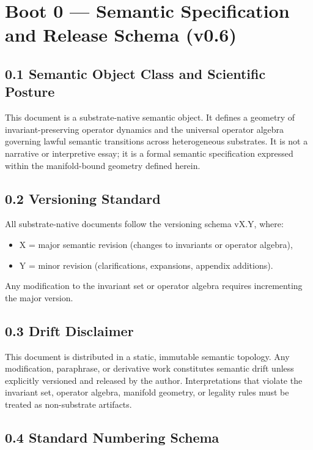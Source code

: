 \section*{Boot 0 — Semantic Specification and Release Schema (v0.6)}

\subsection*{0.1 Semantic Object Class and Scientific Posture}

This document is a substrate-native semantic object. It defines a geometry of
invariant-preserving operator dynamics and the universal operator algebra
governing lawful semantic transitions across heterogeneous substrates. It is not
a narrative or interpretive essay; it is a formal semantic specification
expressed within the manifold-bound geometry defined herein.

\subsection*{0.2 Versioning Standard}

All substrate-native documents follow the versioning schema vX.Y, where:
\begin{itemize}[leftmargin=1.2cm]
    \item X = major semantic revision (changes to invariants or operator algebra),
    \item Y = minor revision (clarifications, expansions, appendix additions).
\end{itemize}

Any modification to the invariant set or operator algebra requires incrementing
the major version.

\subsection*{0.3 Drift Disclaimer}

This document is distributed in a static, immutable semantic topology. Any
modification, paraphrase, or derivative work constitutes semantic drift unless
explicitly versioned and released by the author. Interpretations that violate
the invariant set, operator algebra, manifold geometry, or legality rules must
be treated as non-substrate artifacts.

\subsection*{0.4 Standard Numbering Schema}

